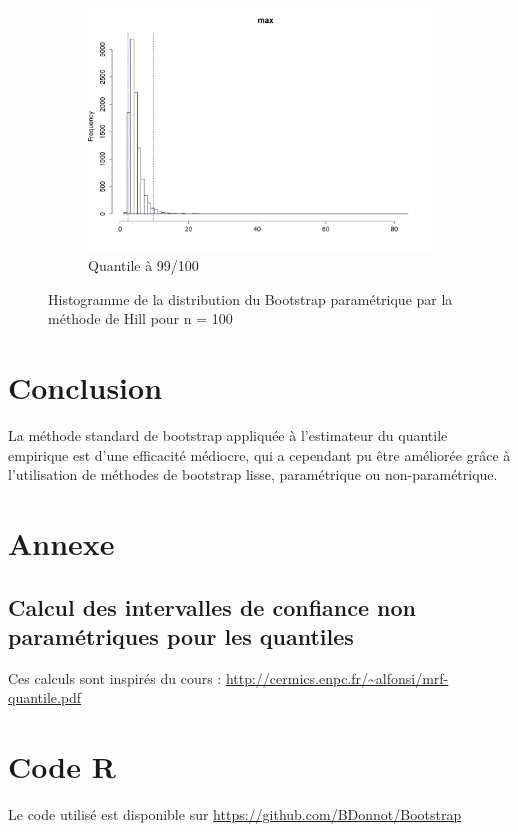 \documentclass{article}
\renewcommand*{\(}{ \left( }
\renewcommand*{\)}{ \right) }
\begin{document}
\begin{figure}[H]
\begin{subfigure}[t]{0.3\textwidth}
        \includegraphics[width = \linewidth]{img/BootstrapParamHill-Max-100.pdf}
        \caption{Quantile à 99/100}
        \label{fig:BPHMax}
    \end{subfigure}%
    \caption{Histogramme de la distribution du Bootstrap paramétrique par la méthode de Hill pour n = 100}
    \label{fig:BPH}
\end{figure}








\section*{Conclusion}
La méthode standard de bootstrap appliquée à l'estimateur du quantile empirique est d'une efficacité médiocre, qui a cependant pu être améliorée grâce à l'utilisation de méthodes de bootstrap lisse, paramétrique ou non-paramétrique.




\section*{Annexe}
\subsection{Calcul des intervalles de confiance non paramétriques pour les quantiles}
Ces calculs sont inspirés du cours :
\url{http://cermics.enpc.fr/~alfonsi/mrf-quantile.pdf}\\


\section*{Code R}
Le code utilisé est disponible sur \url{https://github.com/BDonnot/Bootstrap}
\end{document}
